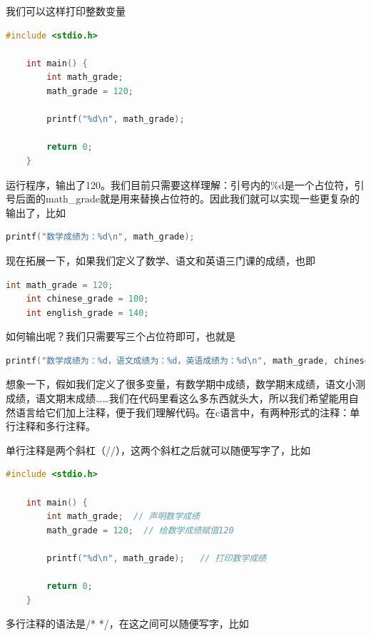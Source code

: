 我们可以这样打印整数变量

\begin{lstlisting}[language=C]
    #include <stdio.h>

    int main() {
        int math_grade;
        math_grade = 120;

        printf("%d\n", math_grade); 

        return 0;
    }
\end{lstlisting}

运行程序，输出了120。我们目前只需要这样理解：引号内的\%d是一个占位符，引号后面的math\_grade就是用来替换占位符的。因此我们就可以实现一些更复杂的输出了，比如

\begin{lstlisting}[language=C]
    printf("数学成绩为：%d\n", math_grade); 
\end{lstlisting}

现在拓展一下，如果我们定义了数学、语文和英语三门课的成绩，也即

\begin{lstlisting}[language=C]
    int math_grade = 120;
    int chinese_grade = 100;
    int english_grade = 140;
\end{lstlisting}

如何输出呢？我们只需要写三个占位符即可，也就是

\begin{lstlisting}[language=C]
    printf("数学成绩为：%d，语文成绩为：%d，英语成绩为：%d\n", math_grade, chinese_grade, english_grade); 
\end{lstlisting}

想象一下，假如我们定义了很多变量，有数学期中成绩，数学期末成绩，语文小测成绩，语文期末成绩……我们在代码里看这么多东西就头大，所以我们希望能用自然语言给它们加上注释，便于我们理解代码。在c语言中，有两种形式的注释：单行注释和多行注释。

单行注释是两个斜杠（//），这两个斜杠之后就可以随便写字了，比如

\begin{lstlisting}[language=C]
    #include <stdio.h>

    int main() {
        int math_grade;  // 声明数学成绩
        math_grade = 120;  // 给数学成绩赋值120

        printf("%d\n", math_grade);   // 打印数学成绩

        return 0;
    }
\end{lstlisting}

多行注释的语法是/* */，在这之间可以随便写字，比如

